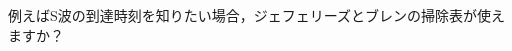 \documentclass{ltjsarticle}
\begin{document}
例えばS波の到達時刻を知りたい場合，ジェフェリーズとブレンの掃除表が使えますか？
\end{document}
